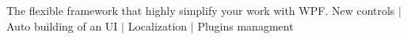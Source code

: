 The flexible framework that highly simplify your work with W\+PF. New controls $\vert$ Auto building of an UI $\vert$ Localization $\vert$ Plugins managment 